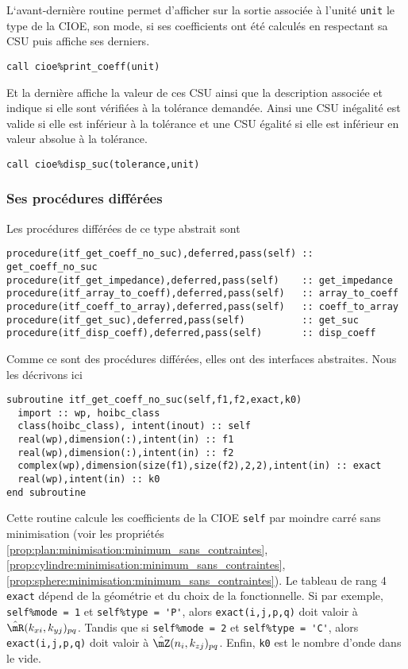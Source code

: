       L`avant-dernière routine permet d'afficher sur la sortie associée à l'unité \lstinline{unit} le type de la CIOE, son mode, si ses coefficients ont été calculés en respectant sa CSU puis affiche ses derniers.
\begin{lstlisting}
call cioe%print_coeff(unit)
\end{lstlisting}

      Et la dernière affiche la valeur de ces CSU ainsi que la description associée et indique si elle sont vérifiées à la tolérance demandée. Ainsi une CSU inégalité est valide si elle est inférieur à la tolérance et une CSU égalité si elle est inférieur en valeur absolue à la tolérance.
\begin{lstlisting}
call cioe%disp_suc(tolerance,unit)
\end{lstlisting}

    \subsubsection{Ses procédures différées}
      Les procédures différées de ce type abstrait sont
\begin{lstlisting}
procedure(itf_get_coeff_no_suc),deferred,pass(self) :: get_coeff_no_suc
procedure(itf_get_impedance),deferred,pass(self)    :: get_impedance
procedure(itf_array_to_coeff),deferred,pass(self)   :: array_to_coeff
procedure(itf_coeff_to_array),deferred,pass(self)   :: coeff_to_array
procedure(itf_get_suc),deferred,pass(self)          :: get_suc
procedure(itf_disp_coeff),deferred,pass(self)       :: disp_coeff
\end{lstlisting}
      Comme ce sont des procédures différées, elles ont des interfaces abstraites. Nous les décrivons ici
\begin{lstlisting}
subroutine itf_get_coeff_no_suc(self,f1,f2,exact,k0)
  import :: wp, hoibc_class
  class(hoibc_class), intent(inout) :: self
  real(wp),dimension(:),intent(in) :: f1
  real(wp),dimension(:),intent(in) :: f2
  complex(wp),dimension(size(f1),size(f2),2,2),intent(in) :: exact
  real(wp),intent(in) :: k0
end subroutine
\end{lstlisting}
      Cette routine calcule les coefficients de la CIOE \lstinline{self} par moindre carré sans minimisation (voir les propriétés \ref{prop:plan:minimisation:minimum_sans_contraintes}, \ref{prop:cylindre:minimisation:minimum_sans_contraintes}, \ref{prop:sphere:minimisation:minimum_sans_contraintes}).
      Le tableau de rang 4 \lstinline{exact} dépend de la géométrie et du choix de la fonctionnelle. Si par exemple, \lstinline{self%mode = 1} et \lstinline{self%type = 'P'}, alors \lstinline{exact(i,j,p,q)} doit valoir à \(\hat\mR(k_{xi},k_{yj})_{pq}\). Tandis que  si \lstinline{self%mode = 2} et \lstinline{self%type = 'C'}, alors \lstinline{exact(i,j,p,q)} doit valoir à \(\hat\mZ(n_i,k_{zj})_{pq}\).
      Enfin, \lstinline{k0} est le nombre d'onde dans le vide.

